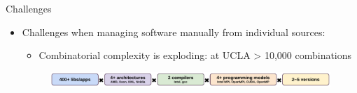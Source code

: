 \documentclass[final]{beamer}
\newlength{\onecolwid}
\begin{document}
\begin{frame}[t]
\begin{columns}[t]
\begin{column}{\onecolwid}
\begin{block}{Challenges}
\setlength{\leftmargini}{1cm}
\setlength{\leftmarginii}{2.5cm}
\setlength{\leftmarginiii}{2.5cm}
\begin{itemize}
    \item Challenges when managing software manually from individual sources: 
        \begin{itemize}
            \item Combinatorial complexity is exploding: at UCLA > 10,000 combinations
        \end{itemize}
        \begin{figure}[htbp]
          \centerline{\includegraphics[width=1\linewidth]{figures/CombComp_ucla.pdf}}
          \label{fig:combcomp_ucla}
        \end{figure}


\end{itemize}
\end{block}
\end{column}
\end{columns}
\end{frame}
\end{document}
